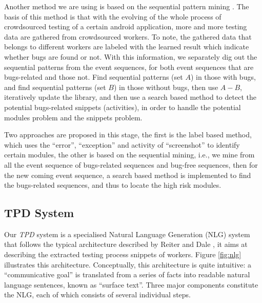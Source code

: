 \documentclass[10pt,conference]{IEEEtran}
\begin{document}
Another method we are using is based on the sequential pattern mining \cite{fournier2014fast}. The basis of this
method is that with the evolving of the whole process of crowdsourced testing of a certain android application,
more and more testing data are gathered from crowdsourced workers. To note, the gathered data that belongs
to different workers are labeled with the learned result which indicate whether bugs are found or not. With this
information, we separately dig out the sequential patterns from the event sequences, for both event sequences that
are bugs-related and those not. Find sequential patterns (set $A$) in those with bugs, and find sequential patterns (set $B$) in those
without bugs, then use $A-B$, iteratively update the library, and then use a search based method to detect the potential
bugs-related snippets (activities), in order to handle the potential modules problem and the snippets problem. 


Two approaches are proposed in this stage, the first is the label based method, which uses the ``error'', ``exception'' and
activity of ``screenshot'' to identify certain modules, the other is based on the sequential mining, i.e., we mine from all
the event sequence of bugs-related sequences and bug-free sequences, then for the new coming event sequence,
a search based method is implemented to find the bugs-related sequences, and thus to locate the high risk modules.

\subsection{TPD System}\label{tpd}

Our \emph{TPD} system is a specialised Natural Language Generation (NLG) system that follows the typical architecture
described by Reiter and Dale \cite{reiter2000building}, it aims at describing the extracted testing process snippets of workers.
Figure \ref{fig:nlg} illustrates this architecture. Conceptually, this architecture is quite intuitive: a ``communicative goal'' is
translated from a series of facts into readable natural language sentences, known as ``surface text''. Three major components
constitute the NLG, each of which consists of several individual steps.
\end{document}
